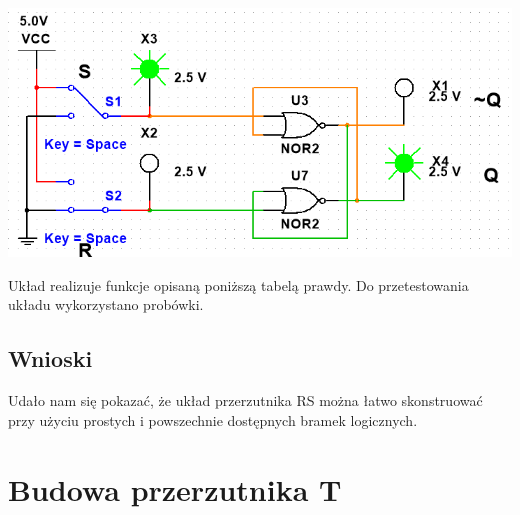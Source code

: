 \documentclass{article}
\begin{document}
            \begin{center}
                \includegraphics[width=18cm]{reports/img/Z2A_1.png}\\
            \end{center}
            Układ realizuje funkcje opisaną poniższą tabelą prawdy. Do przetestowania układu wykorzystano probówki. 
        
        \subsection{Wnioski}
            Udało nam się pokazać, że układ przerzutnika RS można łatwo skonstruować przy użyciu prostych i powszechnie dostępnych bramek logicznych. 
        
    \section{Budowa przerzutnika T}
\end{document}
